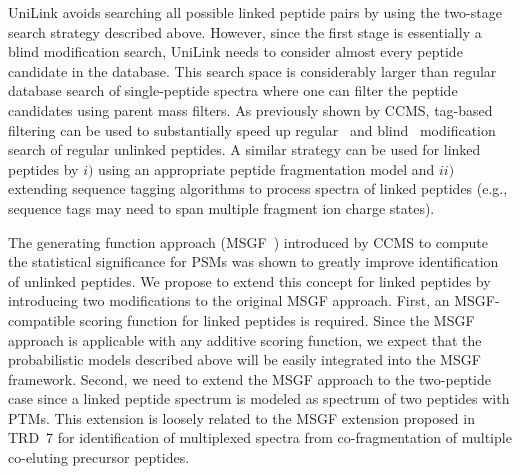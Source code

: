 \documentclass[arial,11pt]{article}
\begin{document}
UniLink avoids searching all possible linked peptide pairs by using the two-stage search strategy described above.  However, since the first stage is essentially a blind modification search, UniLink needs to consider almost every peptide candidate in the database.  This search space is considerably larger than regular database search of single-peptide spectra where one can filter the peptide candidates using parent mass filters. As previously shown by CCMS, tag-based filtering can be used to substantially speed up regular~\cite{tanner05} and blind~\cite{na2012} modification search of regular unlinked peptides. A similar strategy can be used for linked peptides by $i)$ using an appropriate peptide fragmentation model and $ii)$ extending sequence tagging algorithms to process spectra of linked peptides (e.g., sequence tags may need to span multiple fragment ion charge states).

The generating function approach (MSGF~\cite{kim2008}) introduced by CCMS to compute the statistical significance for PSMs was shown to greatly improve identification of unlinked peptides.  We propose to extend this concept for linked peptides by introducing two modifications to the original MSGF approach. First, an MSGF-compatible scoring function for linked peptides is required. Since the MSGF approach is applicable with any additive scoring function, we expect that the probabilistic models described above will be easily integrated into the MSGF framework.  Second, we need to extend the MSGF approach to the two-peptide case since a linked peptide spectrum is modeled as spectrum of two peptides with PTMs. This extension is loosely related to the MSGF extension proposed in TRD~7 for identification of multiplexed spectra from co-fragmentation of multiple co-eluting precursor peptides.

\end{document}
